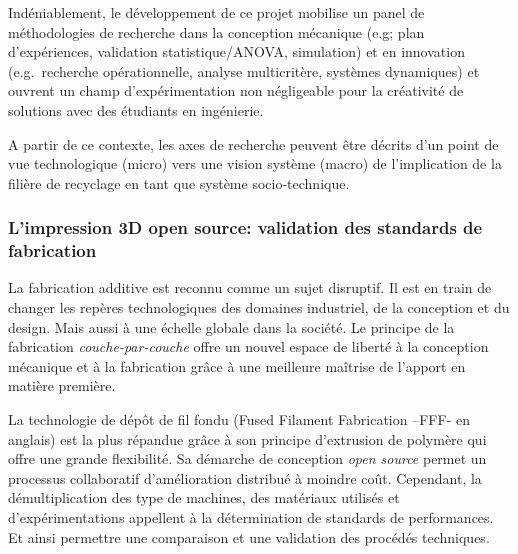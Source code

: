 \documentclass[
  11pt,
]{article}
\begin{document}
Indéniablement, le développement de ce projet mobilise un panel de
méthodologies de recherche dans la conception mécanique (e.g; plan
d'expériences, validation statistique/ANOVA, simulation) et en
innovation (e.g.~recherche opérationnelle, analyse multicritère,
systèmes dynamiques) et ouvrent un champ d'expérimentation non
négligeable pour la créativité de solutions avec des étudiants en
ingénierie.

A partir de ce contexte, les axes de recherche peuvent être décrits d'un
point de vue technologique (micro) vers une vision système (macro) de
l'implication de la filière de recyclage en tant que système
socio-technique.

\hypertarget{limpression-3d-open-source-validation-des-standards-de-fabrication}{%
\subsubsection{L'impression 3D open source: validation des standards de
fabrication}\label{limpression-3d-open-source-validation-des-standards-de-fabrication}}

La fabrication additive est reconnu comme un sujet disruptif. Il est en
train de changer les repères technologiques des domaines industriel, de
la conception et du design. Mais aussi à une échelle globale dans la
société. Le principe de la fabrication \emph{couche-par-couche} offre un
nouvel espace de liberté à la conception mécanique et à la fabrication
grâce à une meilleure maîtrise de l'apport en matière première.

La technologie de dépôt de fil fondu (Fused Filament Fabrication --FFF-
en anglais) est la plus répandue grâce à son principe d'extrusion de
polymère qui offre une grande flexibilité. Sa démarche de conception
\emph{open source} permet un processus collaboratif d'amélioration
distribué à moindre coût. Cependant, la démultiplication des type de
machines, des matériaux utilisés et d'expérimentations appellent à la
détermination de standards de performances. Et ainsi permettre une
comparaison et une validation des procédés techniques.
\end{document}
